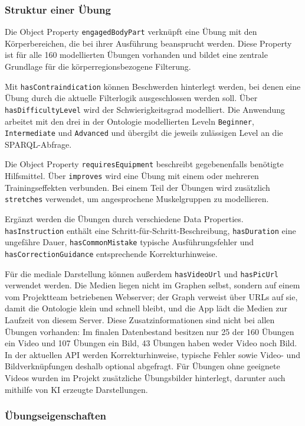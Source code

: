 \subsubsection{Struktur einer Übung}
\label{sec:ontologie-struktur}

Die Object Property \texttt{engagedBodyPart} verknüpft eine Übung mit den Körperbereichen, die bei ihrer Ausführung beansprucht werden. Diese Property ist für alle 160 modellierten Übungen vorhanden und bildet eine zentrale Grundlage für die körperregionsbezogene Filterung.

Mit \texttt{hasContraindication} können Beschwerden hinterlegt werden, bei denen eine Übung durch die aktuelle Filterlogik ausgeschlossen werden soll. Über \texttt{hasDifficultyLevel} wird der Schwierigkeitsgrad modelliert. Die Anwendung arbeitet mit den drei in der Ontologie modellierten Leveln \texttt{Beginner}, \texttt{Intermediate} und \texttt{Advanced} und übergibt die jeweils zulässigen Level an die SPARQL-Abfrage.

Die Object Property \texttt{requiresEquipment} beschreibt gegebenenfalls benötigte Hilfsmittel. Über \texttt{improves} wird eine Übung mit einem oder mehreren Trainingseffekten verbunden. Bei einem Teil der Übungen wird zusätzlich \texttt{stretches} verwendet, um angesprochene Muskelgruppen zu modellieren.


Ergänzt werden die Übungen durch verschiedene Data Properties. \texttt{hasInstruction} enthält eine Schritt-für-Schritt-Beschreibung, \texttt{hasDuration} eine ungefähre Dauer, \texttt{hasCommonMistake} typische Ausführungsfehler und \texttt{hasCorrectionGuidance} entsprechende Korrekturhinweise.

Für die mediale Darstellung können außerdem \texttt{hasVideoUrl} und \texttt{hasPicUrl} verwendet werden. Die Medien liegen nicht im Graphen selbst, sondern auf einem vom Projektteam betriebenen Webserver; der Graph verweist über URLs auf sie, damit die Ontologie klein und schnell bleibt, und die App lädt die Medien zur Laufzeit von diesem Server. Diese Zusatzinformationen sind nicht bei allen Übungen vorhanden: Im finalen Datenbestand besitzen nur 25 der 160 Übungen ein Video und 107 Übungen ein Bild, 43 Übungen haben weder Video noch Bild. In der aktuellen API werden Korrekturhinweise, typische Fehler sowie Video- und Bildverknüpfungen deshalb optional abgefragt. Für Übungen ohne geeignete Videos wurden im Projekt zusätzliche Übungsbilder hinterlegt, darunter auch mithilfe von KI erzeugte Darstellungen.

\subsubsection{Übungseigenschaften}

